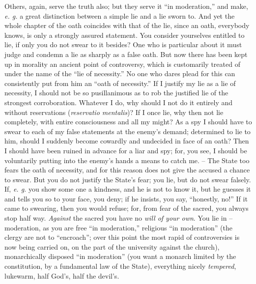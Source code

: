 \documentclass[12pt,a4paper]{book}
\begin{document}
Others, again, serve the truth also; but they serve it ``in moderation,'' 
and make, \textit{e. g.} a great distinction between a simple lie and a lie 
sworn to. And yet the whole chapter of the oath coincides with that of the 
lie, since an oath, everybody knows, is only a strongly assured statement. You 
consider yourselves entitled to lie, if only you do not swear to it besides? 
One who is particular about it must judge and condemn a lie as sharply as a 
false oath. But now there has been kept up in morality an ancient point of 
controversy, which is customarily treated of under the name of the ``lie of 
necessity.'' No one who dares plead for this can consistently put from him an 
``oath of necessity.'' If I justify my lie as a lie of necessity, I should 
not be so pusillanimous as to rob the justified lie of the strongest 
corroboration. Whatever I do, why should I not do it entirely and without 
reservations (\textit{reservatio mentalis})? If I once lie, why then not lie 
completely, with entire consciousness and all my might? As a spy I should have 
to swear to each of my false statements at the enemy's demand; determined to 
lie to him, should I suddenly become cowardly and undecided in face of an 
oath? Then I should have been ruined in advance for a liar and spy; for, you 
see, I should be voluntarily putting into the enemy's hands a means to catch 
me. -- The State too fears the oath of necessity, and for this reason does not 
give the accused a chance to swear. But you do not justify the State's fear; 
you lie, but do not swear falsely. If, \textit{e. g.} you show some one a 
kindness, and he is not to know it, but he guesses it and tells you so to your 
face, you deny; if he insists, you say, ``honestly, no!'' If it came to 
swearing, then you would refuse; for, from fear of the sacred, you always stop 
half way. \textit{Against} the sacred you have no \textit{will of your own}. 
You lie in -- moderation, as you are free ``in moderation,'' religious ``in 
moderation'' (the clergy are not to ``encroach''; over this point the most 
rapid of controversies is now being carried on, on the part of the university 
against the church), monarchically disposed ``in moderation'' (you want a 
monarch limited by the constitution, by a fundamental law of the State), 
everything nicely \textit{tempered}, lukewarm, half God's, half the devil's.
\end{document}
